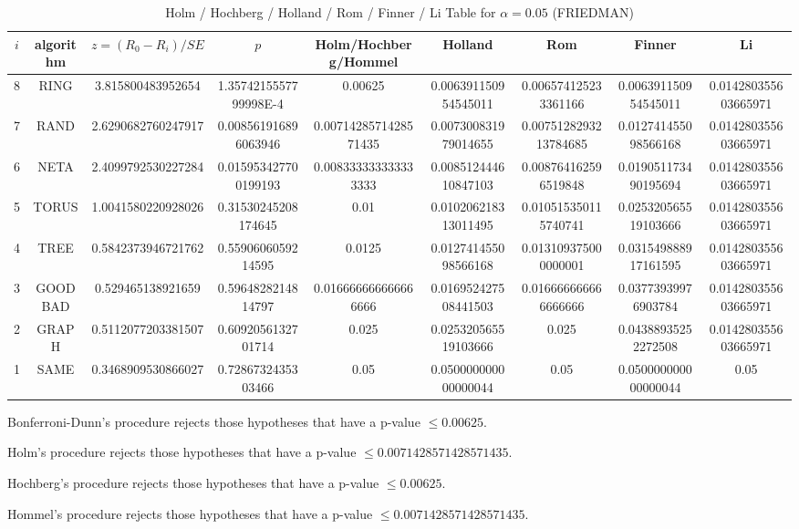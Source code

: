 \documentclass[a4paper,10pt]{article}
\begin{document}
\begin{landscape}
\begin{table}[!htp]
\begin{tabular}{
|r|r|r|r|r|r|r|r|r|r|}
\end{tabular}
\end{table}

\newpage

\begin{table}[!htp]
\centering\scriptsize
\caption{Holm / Hochberg / Holland / Rom / Finner / Li Table for $\alpha=0.05$ (FRIEDMAN)}
\begin{tabular}{ccccccccc}
$i$&algorithm&$z=(R_0 - R_i)/SE$&$p$&Holm/Hochberg/Hommel&Holland&Rom&Finner&Li\\
\hline
8& RING&3.815800483952654&1.3574215557799998E-4&0.00625&0.006391150954545011&0.006574125233361166&0.006391150954545011&0.014280355603665971\\
7& RAND&2.6290682760247917&0.008561916896063946&0.0071428571428571435&0.007300831979014655&0.0075128293213784685&0.012741455098566168&0.014280355603665971\\
6& NETA&2.4099792530227284&0.015953427700199193&0.008333333333333333&0.008512444610847103&0.008764162596519848&0.019051173490195694&0.014280355603665971\\
5& TORUS&1.0041580220928026&0.31530245208174645&0.01&0.010206218313011495&0.010515350115740741&0.025320565519103666&0.014280355603665971\\
4& TREE&0.5842373946721762&0.5590606059214595&0.0125&0.012741455098566168&0.013109375000000001&0.031549888917161595&0.014280355603665971\\
3& GOODBAD&0.529465138921659&0.5964828214814797&0.016666666666666666&0.016952427508441503&0.016666666666666666&0.03773939976903784&0.014280355603665971\\
2& GRAPH&0.5112077203381507&0.6092056132701714&0.025&0.025320565519103666&0.025&0.04388935252272508&0.014280355603665971\\
1& SAME&0.3468909530866027&0.7286732435303466&0.05&0.050000000000000044&0.05&0.050000000000000044&0.05\\
\hline
\end{tabular}
\end{table}
Bonferroni-Dunn's procedure rejects those hypotheses that have a p-value $\le0.00625$.


Holm's procedure rejects those hypotheses that have a p-value $\le0.0071428571428571435$.


Hochberg's procedure rejects those hypotheses that have a p-value $\le0.00625$.


Hommel's procedure rejects those hypotheses that have a p-value $\le0.0071428571428571435$.



\end{landscape}
\end{document}
